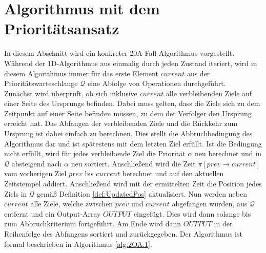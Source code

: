 \documentclass[german,version-2019-11]{uzl-thesis}
\begin{document}
\section{Algorithmus mit dem Prioritätsansatz}

In diesem Abschnitt wird ein konkreter 20A-Fall-Algorithmus vorgestellt. Während der 1D-Algorithmus aus \cite{helvig} einmalig durch jeden Zustand iteriert, wird in diesem Algorithmus immer für das erste Element $current$ aus der Prioritätswarteschlange $\mathcal{Q}$ eine Abfolge von Operationen durchgeführt. \\
Zunächst wird überprüft, ob sich inklusive $current$ alle verbleibenden Ziele auf einer Seite des Ursprungs befinden. Dabei muss gelten, dass die Ziele sich zu dem Zeitpunkt auf einer Seite befinden müssen, zu dem der Verfolger den Ursprung erreicht hat. Das Abfangen der verbleibenden Ziele und die Rückkehr zum Ursprung ist dabei einfach zu berechnen. Dies stellt die Abbruchbedingung des Algorithmus dar und ist spätestens mit dem letzten Ziel erfüllt. Ist die Bedingung nicht erfüllt, wird für jedes verbleibende Ziel die Priorität $\alpha$ neu berechnet und in $\mathcal{Q}$ absteigend nach $\alpha$ neu sortiert. 
Anschließend wird die Zeit $\pi[prev\rightarrow current]$ vom vorherigen Ziel $prev$ bis $current$ berechnet und auf den aktuellen Zeitstempel addiert. Anschließend wird mit der ermittelten Zeit die Position jedes Ziels in $\mathcal{Q}$ gemäß Definition \ref{def:UpdatedPos} aktualisiert. 
Nun werden neben $current$ alle Ziele, welche zwischen $prev$ und $current$ abgefangen wurden, aus $\mathcal{Q}$ entfernt und ein Output-Array $OUTPUT$ eingefügt. Dies wird dann solange bis zum Abbruchkriterium fortgeführt. Am Ende wird dann $OUTPUT$ in der Reihenfolge des Abfangens sortiert und zurückgegeben. Der Algorithmus ist formal beschrieben in Algorithmus \ref{alg:2OA.1}.
\end{document}
